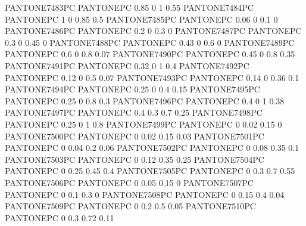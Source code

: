  {PANTONE7483PC} {PANTONE\SpotSpace PC} {0.85 0 1 0.55}
 {PANTONE7484PC} {PANTONE\SpotSpace PC} {1 0 0.85 0.5}
 {PANTONE7485PC} {PANTONE\SpotSpace PC} {0.06 0 0.1 0}
 {PANTONE7486PC} {PANTONE\SpotSpace PC} {0.2 0 0.3 0}
 {PANTONE7487PC} {PANTONE\SpotSpace PC} {0.3 0 0.45 0}
 {PANTONE7488PC} {PANTONE\SpotSpace PC} {0.43 0 0.6 0}
 {PANTONE7489PC} {PANTONE\SpotSpace PC} {0.6 0 0.8 0.07}
 {PANTONE7490PC} {PANTONE\SpotSpace PC} {0.45 0 0.8 0.35}
 {PANTONE7491PC} {PANTONE\SpotSpace PC} {0.32 0 1 0.4}
 {PANTONE7492PC} {PANTONE\SpotSpace PC} {0.12 0 0.5 0.07}
 {PANTONE7493PC} {PANTONE\SpotSpace PC} {0.14 0 0.36 0.1}
 {PANTONE7494PC} {PANTONE\SpotSpace PC} {0.25 0 0.4 0.15}
 {PANTONE7495PC} {PANTONE\SpotSpace PC} {0.25 0 0.8 0.3}
 {PANTONE7496PC} {PANTONE\SpotSpace PC} {0.4 0 1 0.38}
 {PANTONE7497PC} {PANTONE\SpotSpace PC} {0.4 0.3 0.7 0.25}
 {PANTONE7498PC} {PANTONE\SpotSpace PC} {0.25 0 1 0.8}
 {PANTONE7499PC} {PANTONE\SpotSpace PC} {0 0.02 0.15 0}
 {PANTONE7500PC} {PANTONE\SpotSpace PC} {0 0.02 0.15 0.03}
 {PANTONE7501PC} {PANTONE\SpotSpace PC} {0 0.04 0.2 0.06}
 {PANTONE7502PC} {PANTONE\SpotSpace PC} {0 0.08 0.35 0.1}
 {PANTONE7503PC} {PANTONE\SpotSpace PC} {0 0.12 0.35 0.25}
 {PANTONE7504PC} {PANTONE\SpotSpace PC} {0 0.25 0.45 0.4}
 {PANTONE7505PC} {PANTONE\SpotSpace PC} {0 0.3 0.7 0.55}
 {PANTONE7506PC} {PANTONE\SpotSpace PC} {0 0.05 0.15 0}
 {PANTONE7507PC} {PANTONE\SpotSpace PC} {0 0.1 0.3 0}
 {PANTONE7508PC} {PANTONE\SpotSpace PC} {0 0.15 0.4 0.04}
 {PANTONE7509PC} {PANTONE\SpotSpace PC} {0 0.2 0.5 0.05}
 {PANTONE7510PC} {PANTONE\SpotSpace PC} {0 0.3 0.72 0.11}
